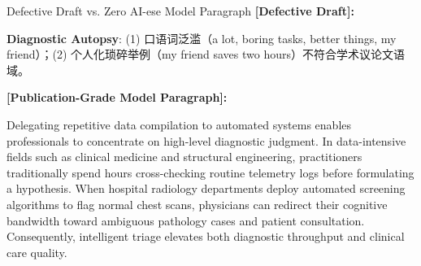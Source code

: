 \begin{ExampleBox}{Defective Draft vs. Zero AI-ese Model Paragraph}
\textbf{\color{TargetHighlight}[Defective Draft]:}\par
{}\par\vspace{4pt}
\textbf{Diagnostic Autopsy}: (1)  口语词泛滥（a lot, boring tasks, better things, my friend）；(2)  个人化琐碎举例（my friend saves two hours）不符合学术议论文语域。\par\vspace{6pt}
\textbf{\color{AcadNavy}[Publication-Grade Model Paragraph]:}\par
Delegating repetitive data compilation to automated systems enables professionals to concentrate on high-level diagnostic judgment. In data-intensive fields such as clinical medicine and structural engineering, practitioners traditionally spend hours cross-checking routine telemetry logs before formulating a hypothesis. When hospital radiology departments deploy automated screening algorithms to flag normal chest scans, physicians can redirect their cognitive bandwidth toward ambiguous pathology cases and patient consultation. Consequently, intelligent triage elevates both diagnostic throughput and clinical care quality.
\end{ExampleBox}

